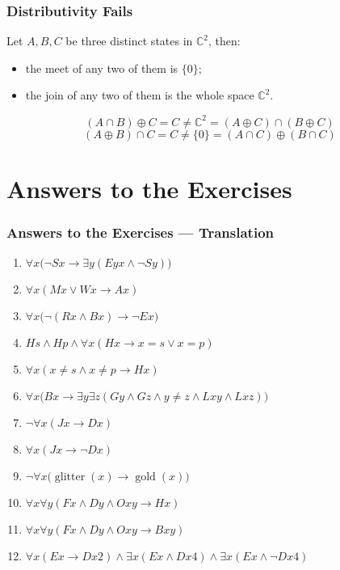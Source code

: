 \documentclass[UTF8,11pt,colorlinks,compress,openany]{beamer}%
\begin{document}
\begin{frame}\frametitle{Distributivity Fails}
Let $A,B,C$ be three distinct states in $\mathbb{C}^2$, then:
	\begin{itemize}
		\item the meet of any two of them is $\{0\}$;
		\item the join of any two of them is the whole space $\mathbb{C}^2$.
	\end{itemize}
\[(A\cap B)\oplus C=C\ne\mathbb{C}^2=(A\oplus C)\cap(B\oplus C)\]
\[(A\oplus B)\cap C=C\ne\{0\}=(A\cap C)\oplus(B\cap C)\]
\end{frame}


\section{Answers to the Exercises}


\begin{frame}\frametitle{Answers to the Exercises --- Translation}
\begin{enumerate}
	\item $\forall x\big(\neg Sx\to\exists y(Eyx\wedge \neg Sy)\big)$
	\item $\forall x(Mx\vee Wx\to Ax)$
	\item $\forall x\big(\neg (Rx\wedge Bx)\to \neg Ex\big)$
	\item $Hs\wedge Hp\wedge\forall x(Hx\to x=s\vee x=p)$
	\item $\forall x(x\ne s\wedge x\ne p\to Hx)$
	\item $\forall x\big(Bx\to \exists y\exists z(Gy\wedge Gz\wedge y\ne z\wedge Lxy\wedge Lxz)\big)$
	\item $\neg\forall x(Jx\to Dx)$
	\item $\forall x(Jx\to\neg Dx)$
	\item $\neg\forall x\big(\operatorname{glitter}(x)\to\operatorname{gold}(x)\big)$
	\item $\forall x\forall y(Fx\wedge Dy\wedge Oxy\to Hx)$
	\item $\forall x\forall y(Fx\wedge Dy\wedge Oxy\to Bxy)$
	\item $\forall x(Ex\to Dx2)\wedge \exists x (Ex\wedge Dx4)\wedge \exists x (Ex\wedge\neg Dx4)$
\end{enumerate}
\end{frame}
\end{document}

